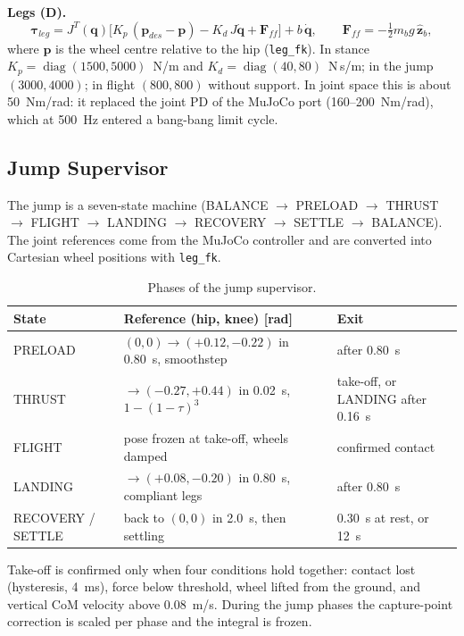 \documentclass[11pt,a4paper]{article}
\newcommand{\bq}{\bm{q}}
\newcommand{\bdq}{\dot{\bm{q}}}
\newcommand{\btau}{\bm{\tau}}
\begin{document}
\textbf{Legs (D).}
\begin{equation}
    \btau_{leg} = J^{T}(\bq)\Big[K_p\,(\bm p_{des}-\bm p) - K_d\,J\bdq + \bm F_{ff}\Big] + b\,\bdq,
    \qquad \bm F_{ff} = -\tfrac12 m_b g\,\hat{\bm z}_b ,
\end{equation}
where $\bm p$ is the wheel centre relative to the hip (\texttt{leg\_fk}).  In stance
$K_p = \operatorname{diag}(1500, 5000)$~N/m and $K_d = \operatorname{diag}(40, 80)$~N\,s/m; in
the jump $(3000, 4000)$; in flight $(800, 800)$ without support.  In joint space this is about
50~Nm/rad: it replaced the joint PD of the MuJoCo port (160--200~Nm/rad), which at 500~Hz
entered a bang-bang limit cycle.

\subsection{Jump Supervisor}

The jump is a seven-state machine (BALANCE $\to$ PRELOAD $\to$ THRUST $\to$ FLIGHT $\to$
LANDING $\to$ RECOVERY $\to$ SETTLE $\to$ BALANCE).  The joint references come from the MuJoCo
controller and are converted into Cartesian wheel positions with \texttt{leg\_fk}.

\begin{table}[H]
    \centering
    \caption{Phases of the jump supervisor.}
    \label{tab:jump}
    \begin{tabular}{lp{6.8cm}p{3.6cm}}
        \toprule
        State & Reference (hip, knee) [rad] & Exit \\
        \midrule
        PRELOAD & $(0,0)\to(+0.12,-0.22)$ in 0.80~s, smoothstep & after 0.80~s \\
        THRUST & $\to(-0.27,+0.44)$ in 0.02~s, $1-(1-\tau)^3$ & take-off, or LANDING after 0.16~s \\
        FLIGHT & pose frozen at take-off, wheels damped & confirmed contact \\
        LANDING & $\to(+0.08,-0.20)$ in 0.80~s, compliant legs & after 0.80~s \\
        RECOVERY / SETTLE & back to $(0,0)$ in 2.0~s, then settling & 0.30~s at rest, or 12~s \\
        \bottomrule
    \end{tabular}
\end{table}

Take-off is confirmed only when four conditions hold together: contact lost (hysteresis,
4~ms), force below threshold, wheel lifted from the ground, and vertical CoM velocity above
0.08~m/s.  During the jump phases the capture-point correction is scaled per phase and the
integral is frozen.
\end{document}
